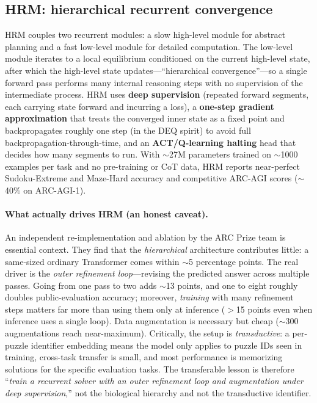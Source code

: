 \subsection{HRM: hierarchical recurrent convergence}
HRM \citep{lat:wang2025hrm} couples two recurrent modules: a slow high-level module for
abstract planning and a fast low-level module for detailed computation. The low-level module
iterates to a local equilibrium conditioned on the current high-level state, after which the
high-level state updates---``hierarchical convergence''---so a single forward pass performs
many internal reasoning steps with no supervision of the intermediate process. HRM uses
\textbf{deep supervision} (repeated forward segments, each carrying state forward and
incurring a loss), a \textbf{one-step gradient approximation} that treats the converged inner
state as a fixed point and backpropagates roughly one step (in the DEQ spirit) to avoid full
backpropagation-through-time, and an \textbf{ACT/Q-learning halting} head that decides how
many segments to run. With $\sim$27M parameters trained on $\sim$1000 examples per task and
no pre-training or CoT data, HRM reports near-perfect Sudoku-Extreme and Maze-Hard accuracy
and competitive ARC-AGI scores ($\sim$40\% on ARC-AGI-1).

\paragraph{What actually drives HRM (an honest caveat).}
An independent re-implementation and ablation by the ARC Prize team \citep{lat:arcprize2025hrm}
is essential context. They find that the \emph{hierarchical} architecture contributes little:
a same-sized ordinary Transformer comes within $\sim$5 percentage points. The real driver is
the \emph{outer refinement loop}---revising the predicted answer across multiple passes.
Going from one pass to two adds $\sim$13 points, and one to eight roughly doubles
public-evaluation accuracy; moreover, \emph{training} with many refinement steps matters far
more than using them only at inference ($>$15 points even when inference uses a single loop).
Data augmentation is necessary but cheap ($\sim$300 augmentations reach near-maximum).
Critically, the setup is \emph{transductive}: a per-puzzle identifier embedding means the
model only applies to puzzle IDs seen in training, cross-task transfer is small, and most
performance is memorizing solutions for the specific evaluation tasks. The transferable lesson
is therefore ``\emph{train a recurrent solver with an outer refinement loop and augmentation
under deep supervision},'' not the biological hierarchy and not the transductive identifier.

